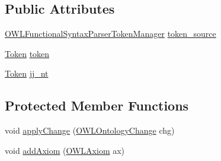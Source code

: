 \subsection*{Public Attributes}
\begin{DoxyCompactItemize}
\item 
\hyperlink{classorg_1_1coode_1_1owlapi_1_1functionalparser_1_1_o_w_l_functional_syntax_parser_token_manager}{O\-W\-L\-Functional\-Syntax\-Parser\-Token\-Manager} \hyperlink{classorg_1_1coode_1_1owlapi_1_1functionalparser_1_1_o_w_l_functional_syntax_parser_a2b865f1ff7a502bc9f8e8d51acef4da7}{token\-\_\-source}
\item 
\hyperlink{classorg_1_1coode_1_1owlapi_1_1functionalparser_1_1_token}{Token} \hyperlink{classorg_1_1coode_1_1owlapi_1_1functionalparser_1_1_o_w_l_functional_syntax_parser_a83eb4cc70611157ec372994ead824fdf}{token}
\item 
\hyperlink{classorg_1_1coode_1_1owlapi_1_1functionalparser_1_1_token}{Token} \hyperlink{classorg_1_1coode_1_1owlapi_1_1functionalparser_1_1_o_w_l_functional_syntax_parser_acf37f978b13af0c95630e4b7a3498561}{jj\-\_\-nt}
\end{DoxyCompactItemize}
\subsection*{Protected Member Functions}
\begin{DoxyCompactItemize}
\item 
void \hyperlink{classorg_1_1coode_1_1owlapi_1_1functionalparser_1_1_o_w_l_functional_syntax_parser_a0763c6b15bebe17316ccba8cc052a44f}{apply\-Change} (\hyperlink{classorg_1_1semanticweb_1_1owlapi_1_1model_1_1_o_w_l_ontology_change}{O\-W\-L\-Ontology\-Change} chg)
\item 
void \hyperlink{classorg_1_1coode_1_1owlapi_1_1functionalparser_1_1_o_w_l_functional_syntax_parser_a1a0cb875f1b43e3a87b8eb88b7beab40}{add\-Axiom} (\hyperlink{interfaceorg_1_1semanticweb_1_1owlapi_1_1model_1_1_o_w_l_axiom}{O\-W\-L\-Axiom} ax)
\end{DoxyCompactItemize}
